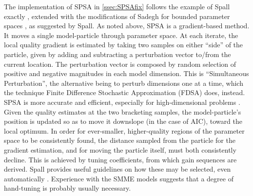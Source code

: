 \documentclass{ut-thesis}
\begin{document}
\begin{NoHyper}
The implementation of SPSA in \autoref{ssec:SPSAfix} follows the example of Spall exactly \cite{Spall1998}, extended with the modifications of Sadegh for bounded parameter spaces \cite{Sadegh1997}, as suggested by Spall. As noted above, SPSA is a gradient-based method. It moves a single model-particle through parameter space. At each iterate, the local quality gradient is estimated by taking two samples on either ``side'' of the particle, given by adding and subtracting a perturbation vector to/from the current location. The perturbation vector is composed by random selection of positive and negative magnitudes in each model dimension. This is ``Simultaneous Perturbation'', the alternative being to perturb dimensions one at a time, which the technique Finite Difference Stochastic Approximation (FDSA) does, instead. SPSA is more accurate and efficient, especially for high-dimensional problems \cite{Chin1997}. Given the quality estimates at the two bracketing samples, the model-particle's position is updated so as to move it downslope (in the case of AIC), toward the local optimum. In order for ever-smaller, higher-quality regions of the parameter space to be consistently found, the distance sampled from the particle for the gradient estimation, and for moving the particle itself, must both consistently decline. This is achieved by tuning coefficients, from which gain sequences are derived. Spall provides useful guidelines on how these may be selected, even automatically \cite{Spall1998}. Experience with the SMME models suggests that a degree of hand-tuning is probably usually necessary.


\end{NoHyper}
\end{document}
